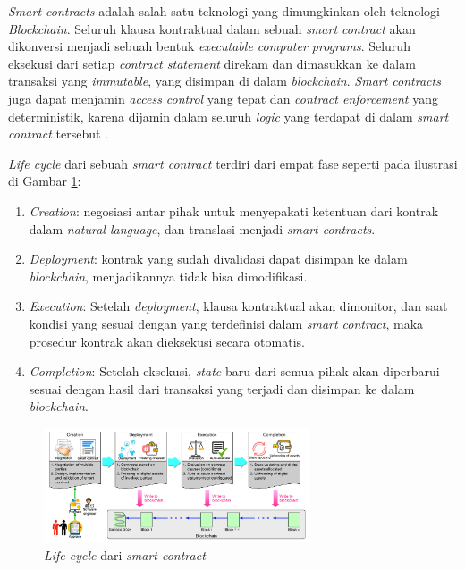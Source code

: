 \textit{Smart contracts} adalah salah satu teknologi yang dimungkinkan oleh teknologi \textit{Blockchain}. Seluruh klausa kontraktual dalam sebuah \textit{smart contract} akan dikonversi menjadi sebuah bentuk \textit{executable computer programs}. Seluruh eksekusi dari setiap \textit{contract statement} direkam dan dimasukkan ke dalam transaksi yang \textit{immutable}, yang disimpan di dalam \textit{blockchain}. \textit{Smart contracts} juga dapat menjamin \textit{access control} yang tepat dan \textit{contract enforcement} yang deterministik, karena dijamin dalam seluruh \textit{logic} yang terdapat di dalam \textit{smart contract} tersebut \parencite{zheng2020overview}.

\textit{Life cycle} dari sebuah \textit{smart contract} terdiri dari empat fase seperti pada ilustrasi di Gambar \ref{image:sc-lifecycle}:

\begin{enumerate}
	\item \textit{Creation}: negosiasi antar pihak untuk menyepakati ketentuan dari kontrak dalam \textit{natural language}, dan translasi menjadi \textit{smart contracts}.
	\item \textit{Deployment}: kontrak yang sudah divalidasi dapat disimpan ke dalam \textit{blockchain}, menjadikannya tidak bisa dimodifikasi.
	\item \textit{Execution}: Setelah \textit{deployment}, klausa kontraktual akan dimonitor, dan saat kondisi yang sesuai dengan yang terdefinisi dalam \textit{smart contract}, maka prosedur kontrak akan dieksekusi secara otomatis.
	\item \textit{Completion}: Setelah eksekusi, \textit{state} baru dari semua pihak akan diperbarui sesuai dengan hasil dari transaksi yang terjadi dan disimpan ke dalam \textit{blockchain}. 
\end{enumerate}

\begin{figure}
	\centering
	\includegraphics[width=0.7\textwidth]{resources/chapter-2/sc-lifecycle.png}
	\caption{\textit{Life cycle} dari \textit{smart contract} \parencite{zheng2020overview}}
	\label{image:sc-lifecycle}
\end{figure}

